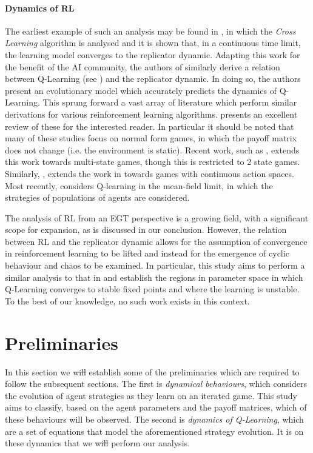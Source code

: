 \documentclass[sigconf,anonymous]{aamas}
\begin{document}
\paragraph{Dynamics of RL} The earliest example of such an analysis may be found in \cite{Borgers1997}, in which the \textit{Cross Learning} algorithm is analysed and it is shown that, in a continuous time limit, the learning model converges to the replicator dynamic. Adapting this work for the benefit of the AI community, the authors of \cite{Tuyls2006AnGames} similarly derive a relation between Q-Learning (see \cite{Barber2012}) and the replicator dynamic. In doing so, the authors present an evolutionary model which accurately predicts the dynamics of Q-Learning. This sprung forward a vast array of literature which perform similar derivations for various reinforcement learning algorithms. \cite{Bloembergen2015} presents an excellent review of these for the interested reader. In particular it should be noted that many of these studies focus on normal form games, in which the payoff matrix does not change (i.e. the environment is static). Recent work, such as \cite{Hennes2008}, extends this work towards multi-state games, though this is restricted to 2 state games. Similarly, \cite{Galstyan2013}, extends the work in \cite{Tuyls2006AnGames} towards games with continuous action spaces. Most recently, \cite{Hu2019} considers Q-learning in the mean-field limit, in which the strategies of populations of agents are considered. 

The analysis of RL from an EGT perspective is a growing field, with a significant scope for expansion, as is discussed in our conclusion. 
However, the relation between RL and the replicator dynamic allows for the assumption of convergence in reinforcement learning to be lifted and instead for the emergence of cyclic behaviour and chaos to be examined. In particular, this study aims to perform a similar analysis to that in \cite{Sanders2018} and establish the regions in parameter space in which Q-Learning converges to stable fixed points and where the learning is unstable. To the best of our knowledge, no such work exists in this context. 

\section{Preliminaries}

In this section we \st{will} establish some of the preliminaries which are
required to follow the subsequent sections. The first is \textit{dynamical behaviours}, 
which considers the evolution of agent strategies as they
learn on an iterated game. This study aims to classify, based on the
agent parameters and the payoff matrices, which of these behaviours
will be observed. The second is \textit{dynamics of Q-Learning}, which are a set
of equations that model the aforementioned strategy evolution. It is
on these dynamics that we \st{will} perform our analysis.
\end{document}
